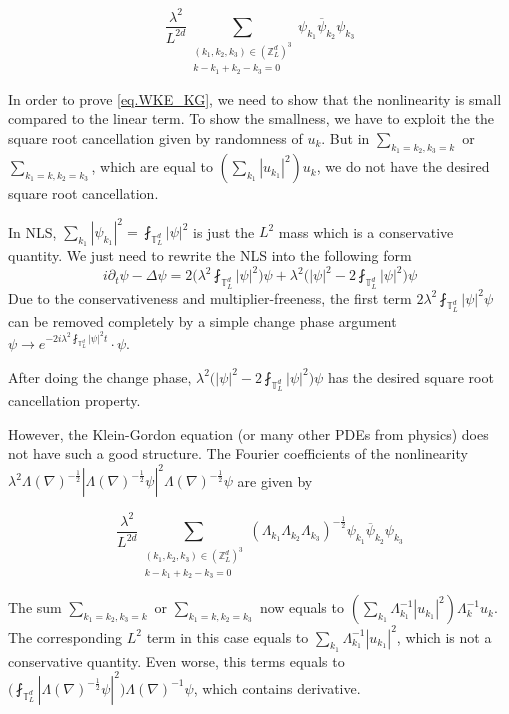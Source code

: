 \begin{equation}
    \frac{\lambda^2}{L^{2d}} \sum\limits_{\substack{(k_1,k_2,k_{3}) \in (\mathbb{Z}^d_L)^3 \\ k - k_1 + k_2 -k_3 = 0}} \psi_{k_1}\overline{\psi}_{k_2}  \psi_{k_3}
\end{equation}

In order to prove \eqref{eq.WKE_KG}, we need to show that the nonlinearity is small compared to the linear term. To show the smallness, we have to exploit the the square root cancellation given by randomness of $u_k$.
But in $\sum_{k_1=k_2,k_3=k}$ or $\sum_{k_1=k,k_2=k_3}$, which are equal to $ (\sum_{k_1}|u_{k_1}|^2) u_k$, we do not have the desired square root cancellation.

In NLS, $ \sum_{k_1}|\psi_{k_1}|^2 = \fint_{\mathbb{T}_L^d}|\psi|^2$ is just the $L^2$ mass which is a conservative quantity. We just need to rewrite the NLS into the following form 
\begin{equation}
    i\partial_t\psi-\Delta\psi =  2\bigg(\lambda^2\fint_{\mathbb{T}_L^d}|\psi|^2\bigg)\psi + \lambda^2\bigg(|\psi|^2-2\fint_{\mathbb{T}_L^d}|\psi|^2\bigg)\psi
\end{equation}
Due to the conservativeness and multiplier-freeness, the first term $2\lambda^2\fint_{\mathbb{T}_L^d}|\psi|^2\psi$ can be removed completely by a simple change phase argument $\psi \rightarrow e^{-2i\lambda^2\fint_{\mathbb{T}_L^d}|\psi|^2t}\cdot \psi$. 

After doing the change phase, $\lambda^2\bigg(|\psi|^2-2\fint_{\mathbb{T}_L^d}|\psi|^2\bigg)\psi$ has the desired square root cancellation property.

However, the Klein-Gordon equation (or many other PDEs from physics) does not have such a good structure. The Fourier coefficients of the nonlinearity $\lambda^2 \Lambda(\nabla)^{-\frac{1}{2}}|\Lambda(\nabla)^{-\frac{1}{2}}\psi|^2\Lambda(\nabla)^{-\frac{1}{2}}\psi$ are given by

\begin{equation}
    \frac{\lambda^2}{L^{2d}} \sum\limits_{\substack{(k_1,k_2,k_{3}) \in (\mathbb{Z}^d_L)^3 \\ k - k_1 + k_2 -k_3 = 0}} (\Lambda_{k_1}\Lambda_{k_2}\Lambda_{k_3})^{-\frac{1}{2}}\psi_{k_1}\overline{\psi}_{k_2}  \psi_{k_3}
\end{equation}

The sum $\sum_{k_1=k_2,k_3=k}$ or $\sum_{k_1=k,k_2=k_3}$ now equals to $ (\sum_{k_1}\Lambda_{k_1}^{-1}|u_{k_1}|^2) \Lambda_{k}^{-1}u_k$. The corresponding $L^2$ term in this case equals to $\sum_{k_1}\Lambda_{k_1}^{-1}|u_{k_1}|^2$, which is not a conservative quantity. Even worse, this terms equals to $\bigg(\fint_{\mathbb{T}_L^d}|\Lambda(\nabla)^{-\frac{1}{2}}\psi|^2\bigg)\Lambda(\nabla)^{-1}\psi $, which contains derivative. 


